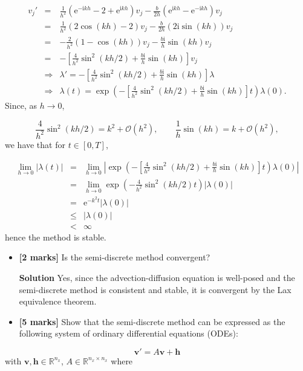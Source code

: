 \documentclass[12pt,a4paper]{article}
\begin{document}
\begin{eqnarray*}
v_j' &=& \frac{1}{h^2}\left(\mathrm{e}^{{-\mathrm{i}}kh} - 2 + \mathrm{e}^{{\mathrm{i}}kh}   \right)v_j - \frac{b}{2h}\left(\mathrm{e}^{{\mathrm{i}}kh}  - \mathrm{e}^{-{\mathrm{i}}kh}   \right)v_j \\
&=& \frac{1}{h^2}\left(2\cos(kh) - 2   \right)v_j - \frac{b}{2h}\left( 2\mathrm{i}\sin(kh)   \right)v_j \\
&=& -\frac{2}{h^2}\left(1 - \cos(kh)   \right)v_j - \frac{b\mathrm{i}}{h} \sin(kh)  v_j \\
&=& -\left[\frac{4}{h^2}\sin^2(kh/2) + \frac{b\mathrm{i}}{h} \sin(kh)\right]  v_j \\
& \Longrightarrow & \lambda' = -\left[\frac{4}{h^2}\sin^2(kh/2) + \frac{b\mathrm{i}}{h} \sin(kh)\right] \lambda \\
& \Longrightarrow & \lambda(t) = \exp\left( -\left[\frac{4}{h^2}\sin^2(kh/2) + \frac{b\mathrm{i}}{h} \sin(kh)\right] t  \right)\lambda(0).
\end{eqnarray*}
Since, as $h \to 0$,


\begin{equation*}
\frac{4}{h^2}\sin^2(kh/2) = k^2 + \mathcal{O}\left(h^2\right), \qquad \frac{1}{h} \sin(kh) = k + \mathcal{O}\left(h^2\right),
\end{equation*}
we have that for $t \in [0, T]$,


\begin{eqnarray*}
\lim_{h \to 0}\left\vert  \lambda(t)  \right\vert &=& \lim_{h \to 0}\left\vert  \exp\left( -\left[\frac{4}{h^2}\sin^2(kh/2) + \frac{b\mathrm{i}}{h} \sin(kh)\right] t  \right)\lambda(0)  \right\vert \\
&=& \lim_{h \to 0}  \exp\left( -\frac{4}{h^2}\sin^2(kh/2) t  \right)\left\vert\lambda(0)  \right\vert \\
&=& \mathrm{e}^{-k^2t}\left\vert\lambda(0)  \right\vert\\
& \leq & \left\vert\lambda(0)  \right\vert \\
& < & \infty
\end{eqnarray*}
hence the method is stable.

\begin{itemize}
\item[8. ] \textbf{[2 marks]} Is the semi-discrete method convergent?

\textbf{Solution} Yes, since the advection-diffusion equation is well-posed and the semi-discrete method is consistent and stable, it is convergent by the Lax equivalence theorem.


\item[9. ] \textbf{[5 marks]} Show that the semi-discrete method can be expressed as the following system of ordinary differential equations (ODEs):

\end{itemize}
\[
\mathbf{v}' = A\mathbf{v} + \mathbf{h}
\]
with $\mathbf{v}, \mathbf{h} \in \mathbb{R}^{n_x}$, $A \in \mathbb{R}^{n_x \times n_x}$ where
\end{document}
